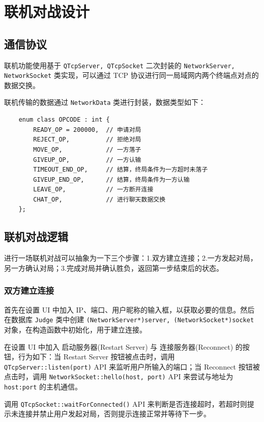 \documentclass{noithesis}
\begin{document}
	\section{联机对战设计}
	
	\subsection{通信协议}
	
	联机功能使用基于 \verb|QTcpServer, QTcpSocket| 二次封装的 \verb|NetworkServer, NetworkSocket| 类实现，可以通过 TCP 协议进行同一局域网内两个终端点对点的数据交换。
	
	联机传输的数据通过 \verb|NetworkData| 类进行封装，数据类型如下：
	\begin{lstlisting}
	enum class OPCODE : int {
    	READY_OP = 200000,  // 申请对局
    	REJECT_OP,          // 拒绝对局
	    MOVE_OP,            // 一方落子
	    GIVEUP_OP,          // 一方认输
	    TIMEOUT_END_OP,     // 结算，终局条件为一方超时未落子
	    GIVEUP_END_OP,      // 结算，终局条件为一方认输
	    LEAVE_OP,           // 一方断开连接
	    CHAT_OP,            // 进行聊天数据交换
	};
	\end{lstlisting}

    \subsection{联机对战逻辑}
    
    进行一场联机对战可以抽象为一下三个步骤：1.双方建立连接；2.一方发起对局，另一方确认对局；3.完成对局并确认胜负，返回第一步结束后的状态。
	
	\subsubsection{双方建立连接}
	
	首先在设置 UI 中加入 IP、端口、用户昵称的输入框，以获取必要的信息。然后在数据库 \verb|Judge| 类中创建 \verb|(NetworkServer*)server, (NetworkSocket*)socket| 对象，在构造函数中初始化，用于建立连接。
	
	在设置 UI 中加入 启动服务器(Restart Server) 与 连接服务器(Reconnect) 的按钮，行为如下：当 Restart Server 按钮被点击时，调用 \verb|QTcpServer::listen(port)| API 来监听用户所输入的端口；当 Reconnect 按钮被点击时，调用 \verb|NetworkSocket::hello(host, port)| API 来尝试与地址为 \verb|host:port| 的主机通信。
	
	调用 \verb|QTcpSocket::waitForConnected()| API 来判断是否连接超时，若超时则提示未连接并禁止用户发起对局，否则提示连接正常并等待下一步。
	
\end{document}
